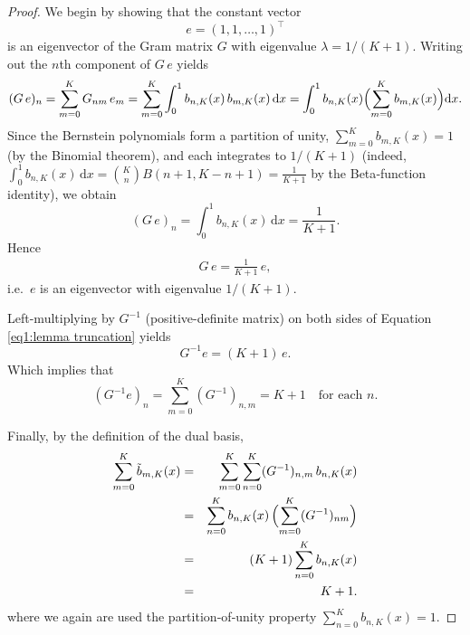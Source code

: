 \documentclass{article}
\begin{document}
\begin{proof}
We begin by showing that the constant vector 
\[
e = (1,1,\dots,1)^\top
\]
is an eigenvector of the Gram matrix $G$ with eigenvalue $\lambda = 1/(K+1)$.  Writing out the $n$th component of $G\,e$ yields
\[
(G\,e)_n
= \sum_{m=0}^K G_{n m}\,e_m
= \sum_{m=0}^K \int_0^1 b_{n,K}(x)\,b_{m,K}(x)\,\mathrm{d}x
= \int_0^1 b_{n,K}(x)\Bigl(\sum_{m=0}^K b_{m,K}(x)\Bigr)\mathrm{d}x.
\]
Since the Bernstein polynomials form a partition of unity, $\sum_{m=0}^K b_{m,K}(x)=1$ (by the Binomial theorem), and each integrates to $1/(K+1)$ (indeed, 
$\int_{0}^{1}b_{n,K}(x)\,\mathrm{d}x =\binom{K}{n}B(n+1,K-n+1) =\frac{1}{K+1}\!$ by the Beta‐function identity), we obtain
\[
(G\,e)_n = \int_0^1 b_{n,K}(x)\,\mathrm{d}x = \frac1{K+1}.
\]
Hence
\begin{align}\label{eq1:lemma truncation}
G\,e = \frac1{K+1}\,e,
\end{align}
i.e.\ $e$ is an eigenvector with eigenvalue $1/(K+1)$.

Left-multiplying by $G^{-1}$ (positive-definite matrix) on both sides of Equation \ref{eq1:lemma truncation} yields
\[
G^{-1}e = (K+1)\,e.
\]
Which implies that
\[
(G^{-1}e)_{n}=\sum_{m=0}^K (G^{-1})_{n,m} = K+1
\quad\text{for each }n.
\]

Finally, by the definition of the dual basis,
\begin{eqnarray*}
\sum_{m=0}^K \tilde b_{m,K}(x)
&=& \sum_{m=0}^K \sum_{n=0}^K (G^{-1})_{n,m}\,b_{n,K}(x)\\
&=& \sum_{n=0}^K b_{n,K}(x)\,\Bigl(\sum_{m=0}^K (G^{-1})_{n m}\Bigr)\\
&=& (K+1)\sum_{n=0}^K b_{n,K}(x)\\
&=& K+1.
\end{eqnarray*}
where we again are used the partition‐of‐unity property $\sum_{n=0}^K b_{n,K}(x)=1$.
\end{proof}
\end{document}

